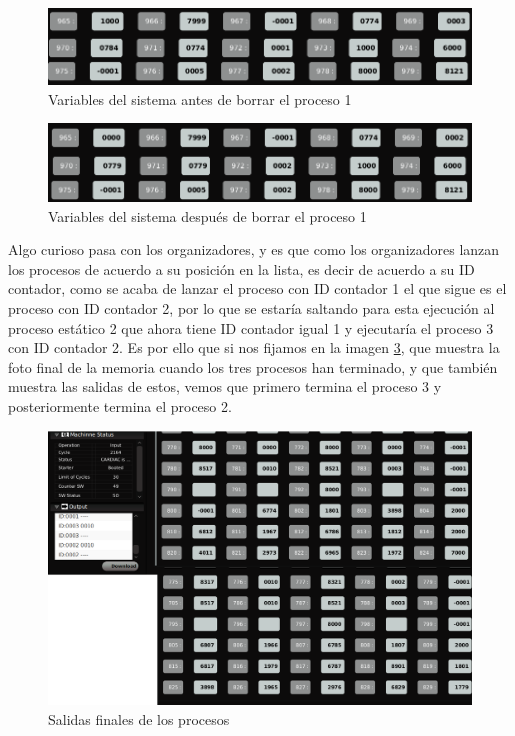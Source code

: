 \documentclass[letterpaper,12pt,oneside]{book}
\begin{document}
		\begin{figure}[h]		
			\centering
			\includegraphics[scale=0.45]{media/CARDIACC/ZVBeforeProceso1Erased.png}
			\caption{ Variables del sistema antes de borrar el proceso 1}
			\label{fig:ZVBeforeProceso1Erased}
		\end{figure}
		
		\begin{figure}[h]		
			\centering
			\includegraphics[scale=0.45]{media/CARDIACC/ZVAfterProceso1Erased.png}
			\caption{ Variables del sistema después de borrar el proceso 1}
			\label{fig:ZVAfterProceso1Erased}
		\end{figure}
		
		Algo curioso pasa con los organizadores, y es que como  los organizadores lanzan los procesos de acuerdo a su posición en la lista, es decir
		de acuerdo a su ID contador, como se acaba de lanzar el proceso con ID contador 1 el que sigue es el proceso
		con ID contador 2, por lo que se estaría saltando para esta ejecución al proceso estático 2 que ahora tiene ID contador igual
		1 y ejecutaría el proceso 3 con ID contador 2. Es por ello que si nos fijamos en la imagen \ref{fig:FinalProcesos}, que muestra
		la foto final de la memoria cuando los tres procesos han terminado, y que también muestra las salidas de estos, vemos que
		primero termina el proceso 3 y posteriormente termina el proceso 2.
		
		\begin{figure}[h]		
			\centering
			\includegraphics[scale=0.38]{media/CARDIACC/FinalProcesos_cut.png}
			\caption{ Salidas finales de los procesos}
			\label{fig:FinalProcesos}
		\end{figure}
		
\end{document}
